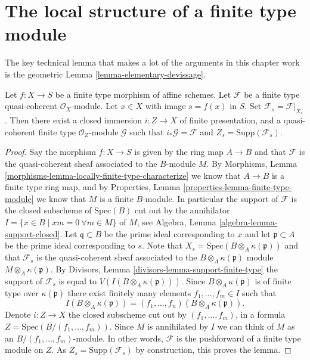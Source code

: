 \section{The local structure of a finite type module}
\label{section-local-structure-module}

\noindent
The key technical lemma that makes a lot of the arguments in this
chapter work is the geometric
Lemma \ref{lemma-elementary-devissage}.

\begin{lemma}
\label{lemma-sheaf-lives-on-subscheme}
Let $f : X \to S$ be a finite type morphism of affine schemes.
Let $\mathcal{F}$ be a finite type quasi-coherent $\mathcal{O}_X$-module.
Let $x \in X$ with image $s = f(x)$ in $S$.
Set $\mathcal{F}_s = \mathcal{F}|_{X_s}$.
Then there exist a closed immersion $i : Z \to X$ of finite presentation,
and a quasi-coherent finite type $\mathcal{O}_Z$-module $\mathcal{G}$
such that $i_*\mathcal{G} = \mathcal{F}$ and
$Z_s = \text{Supp}(\mathcal{F}_s)$.
\end{lemma}

\begin{proof}
Say the morphism $f : X \to S$ is given by the ring map
$A \to B$ and that $\mathcal{F}$ is the quasi-coherent sheaf
associated to the $B$-module $M$. By
Morphisms, Lemma \ref{morphisms-lemma-locally-finite-type-characterize}
we know that $A \to B$ is a finite type ring map, and by
Properties, Lemma \ref{properties-lemma-finite-type-module}
we know that $M$ is a finite $B$-module. In particular the
support of $\mathcal{F}$ is the closed subscheme of $\text{Spec}(B)$
cut out by the annihilator
$I = \{x \in B \mid xm = 0\ \forall m \in M\}$ of $M$, see
Algebra, Lemma \ref{algebra-lemma-support-closed}.
Let $\mathfrak q \subset B$ be the prime ideal corresponding to $x$
and let $\mathfrak p \subset A$ be the prime ideal corresponding to $s$.
Note that $X_s = \text{Spec}(B \otimes_A \kappa(\mathfrak p))$ and
that $\mathcal{F}_s$ is the quasi-coherent sheaf associated to the
$B \otimes_A \kappa(\mathfrak p)$ module $M \otimes_A \kappa(\mathfrak p)$. By
Divisors, Lemma \ref{divisors-lemma-support-finite-type}
the support of $\mathcal{F}_s$ is equal to
$V(I(B \otimes_A \kappa(\mathfrak p)))$. Since
$B \otimes_A \kappa(\mathfrak p)$ is of finite type over $\kappa(\mathfrak p)$
there exist finitely many elements $f_1, \ldots, f_m \in I$
such that
$$
I(B \otimes_A \kappa(\mathfrak p)) =
(f_1, \ldots, f_n)(B \otimes_A \kappa(\mathfrak p)).
$$
Denote $i : Z \to X$ the closed subscheme cut out by
$(f_1, \ldots, f_m)$, in a formula $Z = \text{Spec}(B/(f_1, \ldots, f_m))$.
Since $M$ is annihilated by $I$ we can think of $M$ as an
$B/(f_1, \ldots, f_m)$-module. In other words, $\mathcal{F}$ is the
pushforward of a finite type module on $Z$.
As $Z_s = \text{Supp}(\mathcal{F}_s)$ by construction, this
proves the lemma.
\end{proof}

